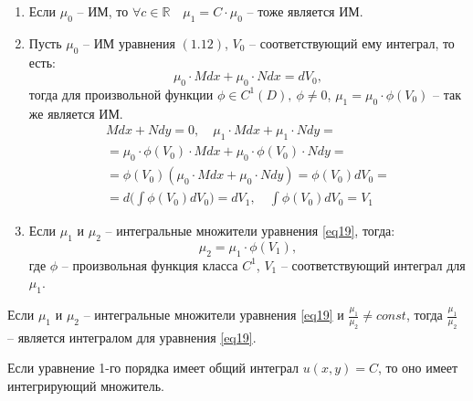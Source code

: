 \begin{note}\leavevmode
    \begin{enumerate}
        \item Если $\mu_0$ -- ИМ, то $\forall c \in \mathbb{R} \quad \mu_1 = C \cdot \mu_0$ -- тоже является ИМ.
        \item Пусть $\mu_0$ -- ИМ уравнения $(1.12)$, $V_0$ -- соответствующий ему интеграл, то есть:
              \[
                  \mu_0 \cdot Mdx + \mu_0 \cdot N dx = d V_0,
              \]
              тогда для произвольной функции $\phi \in C^1(D), \ \phi \ne 0$, $\mu_1 = \mu_0 \cdot \phi(V_0)$ -- так же является ИМ.
              \begin{multline*}
                  Mdx + Ndy = 0, \quad \mu_1 \cdot Mdx + \mu_1 \cdot N dy = \\
                  = \mu_0 \cdot \phi(V_0)\cdot Mdx + \mu_0 \cdot \phi(V_0)\cdot Ndy = \\
                  = \phi(V_0)(\mu_0 \cdot Mdx + \mu_0 \cdot N dy) = \phi(V_0)dV_0 = \\
                  = d\bigg(\int \phi(V_0)dV_0\bigg) = dV_1, \quad \int \phi(V_0)dV_0 = V_1
              \end{multline*}
        \item Если $\mu_1$ и $\mu_2$ -- интегральные множители уравнения \ref{eq19}, тогда:
              \[
                  \mu_2 = \mu_1 \cdot \phi(V_1),
              \]
              где $\phi$ -- произвольная функция класса $C^1$, $V_1$ -- соответствующий интеграл для $\mu_1$.
    \end{enumerate}
\end{note}

\begin{corollary}
    Если $\mu_1$ и $\mu_2$ -- интегральные множители уравнения \ref{eq19} и $\frac{\mu_1}{\mu_2} \ne const$, тогда $\frac{\mu_1}{\mu_2}$ -- является интегралом для уравнения \ref{eq19}.
\end{corollary}

\begin{theorem}
    Если уравнение 1-го порядка имеет общий интеграл $u(x,y) = C$, то оно имеет интегрирующий множитель.
\end{theorem}


